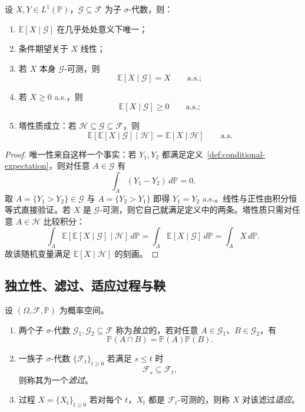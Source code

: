 \begin{proposition}[条件期望的基本性质]\label{prop:conditional-expectation-basic}
设 $X,Y\in L^1(\mathbb P)$，$\mathscr G\subseteq \mathscr F$ 为子 $\sigma$-代数，则：
\begin{enumerate}
  \item $\mathbb E[X\mid \mathscr G]$ 在几乎处处意义下唯一；
  \item 条件期望关于 $X$ 线性；
  \item 若 $X$ 本身 $\mathscr G$-可测，则
  \[
  \mathbb E[X\mid \mathscr G]=X \qquad \text{a.s.};
  \]
  \item 若 $X\ge 0$ a.s.，则
  \[
  \mathbb E[X\mid \mathscr G]\ge 0 \qquad \text{a.s.};
  \]
  \item 塔性质成立：若 $\mathscr H\subseteq \mathscr G\subseteq \mathscr F$，则
  \[
  \mathbb E[\mathbb E[X\mid \mathscr G]\mid \mathscr H]=\mathbb E[X\mid \mathscr H]
  \qquad \text{a.s.}
  \]
\end{enumerate}
\end{proposition}

\begin{proof}
唯一性来自这样一个事实：若 $Y_1,Y_2$ 都满足定义~\ref{def:conditional-expectation}，则对任意 $A\in \mathscr G$ 有
\[
\int_A (Y_1-Y_2)\,d\mathbb P=0.
\]
取 $A=\{Y_1>Y_2\}\in \mathscr G$ 与 $A=\{Y_2>Y_1\}$ 即得 $Y_1=Y_2$ a.s.。线性与正性由积分恒等式直接验证。若 $X$ 是 $\mathscr G$-可测，则它自己就满足定义中的两条。塔性质只需对任意 $A\in \mathscr H$ 比较积分：
\[
\int_A \mathbb E[\mathbb E[X\mid \mathscr G]\mid \mathscr H]\,d\mathbb P
=\int_A \mathbb E[X\mid \mathscr G]\,d\mathbb P
=\int_A X\,d\mathbb P.
\]
故该随机变量满足 $\mathbb E[X\mid \mathscr H]$ 的刻画。
\end{proof}

\subsection{独立性、滤过、适应过程与鞅}

\begin{definition}
设 $(\Omega,\mathscr F,\mathbb P)$ 为概率空间。
\begin{enumerate}
  \item 两个子 $\sigma$-代数 $\mathscr G_1,\mathscr G_2\subseteq \mathscr F$ 称为\emph{独立}的，若对任意 $A\in \mathscr G_1$、$B\in \mathscr G_2$，有
  \[
  \mathbb P(A\cap B)=\mathbb P(A)\mathbb P(B).
  \]
  \item 一族子 $\sigma$-代数 $\{\mathscr F_t\}_{t\ge0}$ 若满足 $s\le t$ 时
  \[
  \mathscr F_s\subseteq \mathscr F_t,
  \]
  则称其为一个\emph{滤过}。
  \item 过程 $X=\{X_t\}_{t\ge0}$ 若对每个 $t$，$X_t$ 都是 $\mathscr F_t$-可测的，则称 $X$ 对该滤过\emph{适应}。
\end{enumerate}
\end{definition}

